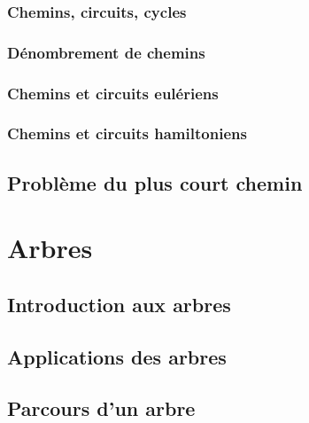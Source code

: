 \documentclass[
  letterpaper,
]{scrbook}
\theoremstyle{definition}
\theoremstyle{definition}
\theoremstyle{plain}
\theoremstyle{remark}
\begin{document}
\hypertarget{chemins-circuits-cycles}{%
\subsection{Chemins, circuits, cycles}\label{chemins-circuits-cycles}}

\hypertarget{duxe9nombrement-de-chemins}{%
\subsection{Dénombrement de chemins}\label{duxe9nombrement-de-chemins}}

\hypertarget{chemins-et-circuits-euluxe9riens}{%
\subsection{Chemins et circuits
eulériens}\label{chemins-et-circuits-euluxe9riens}}

\hypertarget{chemins-et-circuits-hamiltoniens}{%
\subsection{Chemins et circuits
hamiltoniens}\label{chemins-et-circuits-hamiltoniens}}

\hypertarget{probluxe8me-du-plus-court-chemin}{%
\section{Problème du plus court
chemin}\label{probluxe8me-du-plus-court-chemin}}


\hypertarget{arbres}{%
\chapter{Arbres}\label{arbres}}

\hypertarget{introduction-aux-arbres}{%
\section{Introduction aux arbres}\label{introduction-aux-arbres}}

\hypertarget{applications-des-arbres}{%
\section{Applications des arbres}\label{applications-des-arbres}}

\hypertarget{parcours-dun-arbre}{%
\section{Parcours d'un arbre}\label{parcours-dun-arbre}}
\end{document}
